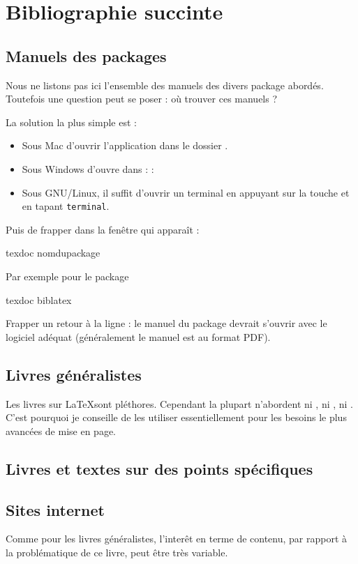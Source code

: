 \chapter{Bibliographie succinte}

\nocite{*}
\section{Manuels des packages}

Nous ne listons pas ici l'ensemble des manuels des divers package abordés. Toutefois une question peut se poser : où trouver ces manuels ?

La solution la plus simple est :
\begin{itemize}
\item Sous Mac d'ouvrir l'application  dans le dossier .
\item Sous Windows d'ouvre  dans  :  : 
\item Sous GNU/Linux, il suffit d'ouvrir un  terminal en appuyant sur la touche  et en tapant \verb|terminal|.
\end{itemize}

Puis de frapper dans la fenêtre qui apparaît :

\begin{bashcode}
texdoc nomdupackage
\end{bashcode}

Par exemple pour le package 

\begin{bashcode}
texdoc biblatex
\end{bashcode}

Frapper un retour à la ligne : le manuel du package devrait s'ouvrir avec le logiciel adéquat (généralement le manuel est au format PDF).

\section{Livres généralistes}

Les livres sur \LaTeX sont pléthores. Cependant la plupart n'abordent ni \XeLaTeX, ni , ni . C'est pourquoi je conseille de les utiliser essentiellement pour les besoins le plus avancées de mise en page.

\printbibliography[keyword=generaliste]

\section{Livres et textes sur des points spécifiques}

\printbibliography[keyword=specifique]


\section{Sites internet}

Comme pour les livres généralistes,  l'interêt en terme de contenu, par rapport à la problématique de ce livre, peut être très variable. 

\printbibliography[keyword=site]
